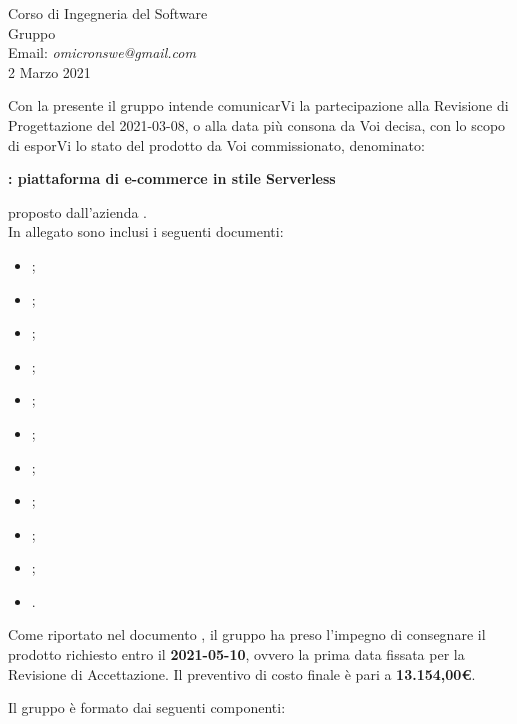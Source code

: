 \documentclass[12pt,a4paper]{letter}
\begin{document}
\begin{letter}
{\begin{flushleft}
			\vspace{1cm}
            Corso di Ingegneria del Software\\ Gruppo \Omicron{}\\ Email:  \textit{omicronswe@gmail.com} \\ 2 Marzo 2021 
        \end{flushleft}
        }
        \opening{ Con la presente il gruppo \Omicron{} intende comunicarVi la partecipazione alla Revisione di Progettazione del 2021-03-08, o alla data più consona da Voi decisa, con lo scopo di esporVi lo stato del prodotto da Voi commissionato, denominato:}
        \begin{center}
           \textbf{\nameproject{} : piattaforma di e-commerce in stile Serverless} 
        \end{center}
        proposto dall'azienda \textit{\Proponente{}}.\\
        In allegato sono inclusi i seguenti documenti:
            \begin{itemize}
                \item {};
                \item {};
                \item {};
                \item {};
                \item {};
                \item {};
                \item {};
                \item {};
                \item {};
                \item {};
                \item {}.
            \end{itemize}
        
        Come riportato nel documento , il gruppo ha preso l'impegno di consegnare il prodotto richiesto entro il \textbf{2021-05-10}, ovvero la prima data fissata per la Revisione di Accettazione. Il preventivo di costo finale è pari a \textbf{13.154,00\euro{}}.
        
        Il gruppo è formato dai seguenti componenti:
        
        {


\centering
\renewcommand{\arraystretch}{1.8}
\begin{longtable}{C{4cm} C{3cm}}


\end{longtable}}
\end{letter}
\end{document}
